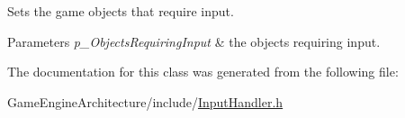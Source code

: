 Sets the game objects that require input. 


\begin{DoxyParams}{Parameters}
{\em p\+\_\+\+Objects\+Requiring\+Input} & the objects requiring input. \\
\hline
\end{DoxyParams}


The documentation for this class was generated from the following file\+:\begin{DoxyCompactItemize}
\item 
Game\+Engine\+Architecture/include/\mbox{\hyperlink{_input_handler_8h}{Input\+Handler.\+h}}\end{DoxyCompactItemize}
